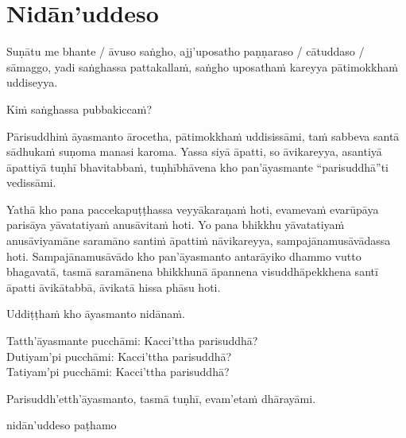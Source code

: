 \section{Nidān'uddeso}
\label{nidan'uddeso}

Suṇātu me bhante / āvuso saṅgho, ajj'uposatho paṇṇaraso / cātuddaso / sāmaggo, yadi saṅghassa pattakallaṁ, saṅgho uposathaṁ kareyya pātimokkhaṁ uddiseyya.

Kiṁ saṅghassa pubbakiccaṁ?

Pārisuddhiṁ āyasmanto ārocetha, pātimokkhaṁ uddisissāmi, taṁ sabbeva santā sādhukaṁ suṇoma manasi karoma. Yassa siyā āpatti, so āvikareyya, asantiyā āpattiyā tuṇhī bhavitabbaṁ, tuṇhībhāvena kho pan'āyasmante “parisuddhā”ti vedissāmi.

Yathā kho pana paccekapuṭṭhassa veyyākaraṇaṁ hoti, evamevaṁ evarūpāya parisāya yāvatatiyaṁ anusāvitaṁ hoti. Yo pana bhikkhu yāvatatiyaṁ anusāviyamāne saramāno santiṁ āpattiṁ nāvikareyya, sampajānamusāvādassa hoti. Sampajānamusāvādo kho pan'āyasmanto antarāyiko dhammo vutto bhagavatā, tasmā saramānena bhikkhunā āpannena visuddhāpekkhena santī āpatti āvikātabbā, āvikatā hissa phāsu hoti.

\medskip

\begin{center}
Uddiṭṭhaṁ kho āyasmanto nidānaṁ.

\smallskip

Tatth'āyasmante pucchāmi: Kacci'ttha parisuddhā?\\
Dutiyam'pi pucchāmi: Kacci'ttha parisuddhā?\\
Tatiyam'pi pucchāmi: Kacci'ttha parisuddhā?

\smallskip

Parisuddh'etth'āyasmanto, tasmā tuṇhī, evam'etaṁ dhārayāmi.
\end{center}

\begin{outro}
  nidān'uddeso paṭhamo
\end{outro}

\clearpage
